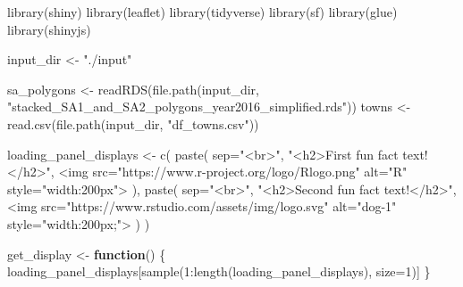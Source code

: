 \documentclass[
]{book}
\newenvironment{Shaded}{\begin{snugshade}}{\end{snugshade}}
\newcommand{\AttributeTok}[1]{\textcolor[rgb]{0.77,0.63,0.00}{#1}}
\newcommand{\ControlFlowTok}[1]{\textcolor[rgb]{0.13,0.29,0.53}{\textbf{#1}}}
\newcommand{\DecValTok}[1]{\textcolor[rgb]{0.00,0.00,0.81}{#1}}
\newcommand{\FunctionTok}[1]{\textcolor[rgb]{0.00,0.00,0.00}{#1}}
\newcommand{\NormalTok}[1]{#1}
\newcommand{\OtherTok}[1]{\textcolor[rgb]{0.56,0.35,0.01}{#1}}
\newcommand{\SpecialCharTok}[1]{\textcolor[rgb]{0.00,0.00,0.00}{#1}}
\newcommand{\StringTok}[1]{\textcolor[rgb]{0.31,0.60,0.02}{#1}}
\begin{document}
\begin{Shaded}
\begin{Highlighting}[]
\FunctionTok{library}\NormalTok{(shiny)}
\FunctionTok{library}\NormalTok{(leaflet)}
\FunctionTok{library}\NormalTok{(tidyverse)}
\FunctionTok{library}\NormalTok{(sf)}
\FunctionTok{library}\NormalTok{(glue)}
\FunctionTok{library}\NormalTok{(shinyjs)}

\NormalTok{input\_dir }\OtherTok{\textless{}{-}} \StringTok{"./input"}

\NormalTok{sa\_polygons }\OtherTok{\textless{}{-}} \FunctionTok{readRDS}\NormalTok{(}\FunctionTok{file.path}\NormalTok{(input\_dir, }\StringTok{"stacked\_SA1\_and\_SA2\_polygons\_year2016\_simplified.rds"}\NormalTok{))}
\NormalTok{towns }\OtherTok{\textless{}{-}} \FunctionTok{read.csv}\NormalTok{(}\FunctionTok{file.path}\NormalTok{(input\_dir, }\StringTok{"df\_towns.csv"}\NormalTok{)) }

\NormalTok{loading\_panel\_displays }\OtherTok{\textless{}{-}} \FunctionTok{c}\NormalTok{(}
  \FunctionTok{paste}\NormalTok{(}
    \AttributeTok{sep=}\StringTok{"\textless{}br\textgreater{}"}\NormalTok{,}
    \StringTok{"\textless{}h2\textgreater{}First fun fact text!\textless{}/h2\textgreater{}"}\NormalTok{,}
    \StringTok{\textquotesingle{}\textless{}img src="https://www.r{-}project.org/logo/Rlogo.png" alt="R" style="width:200px"\textgreater{}\textquotesingle{}}
\NormalTok{  ),}
  \FunctionTok{paste}\NormalTok{(}
    \AttributeTok{sep=}\StringTok{"\textless{}br\textgreater{}"}\NormalTok{,}
    \StringTok{"\textless{}h2\textgreater{}Second fun fact text!\textless{}/h2\textgreater{}"}\NormalTok{,}
    \StringTok{\textquotesingle{}\textless{}img src="https://www.rstudio.com/assets/img/logo.svg" alt="dog{-}1" style="width:200px;"\textgreater{}\textquotesingle{}}
\NormalTok{  )}
\NormalTok{)}

\NormalTok{get\_display }\OtherTok{\textless{}{-}} \ControlFlowTok{function}\NormalTok{() \{}
\NormalTok{  loading\_panel\_displays[}\FunctionTok{sample}\NormalTok{(}\DecValTok{1}\SpecialCharTok{:}\FunctionTok{length}\NormalTok{(loading\_panel\_displays), }\AttributeTok{size=}\DecValTok{1}\NormalTok{)]}
\NormalTok{\}}


\end{Highlighting}
\end{Shaded}
\end{document}

